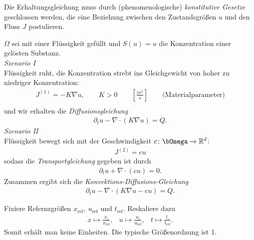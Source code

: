 Die Erhaltungsgleichung muss durch (phenomenologische)
\emph{konstitutive Gesetze} geschlossen werden, die eine Beziehung zwischen den
Zustandsgrö\ss en $u$ und den Fluss $J$ postulieren.


\begin{Beispiel}
    $\Omega$ sei mit einer Flüssigkeit gefüllt und $S(u) = u$ die
    Konzentration einer gelösten Substanz. \\
    \emph{Szenario I} \\
    Flüssigkeit ruht, die Konzentration strebt ins Gleichgewicht von hoher zu
    niedriger Konzentration:
    \begin{eqnarray*}
        J^{(1)} = -K\nabla u, \qquad K > 0 \qquad \left[\frac{m^2}{s}\right]
        \qquad \text{(Materialparameter)}\\
    \end{eqnarray*}
    und wir erhalten die \emph{Diffusionsgleichung}
    \begin{eqnarray*}
        \partial_t u - \nabla \cdot (K \nabla u) = Q.
    \end{eqnarray*}
    \emph{Szenario II} \\
    Flüssigkeit bewegt sich mit der Geschwindigkeit $c\colon \Omega \to \R^d$:
    \begin{eqnarray*}
        J^{(2)} = cu
    \end{eqnarray*}
    sodass die \emph{Transportgleichung} gegeben ist durch
    \begin{eqnarray*}
        \partial_t u + \nabla \cdot (cu) = 0.
    \end{eqnarray*}
    Zusammen ergibt sich die \emph{Konvektions-Diffusions-Gleichung}
    \begin{eqnarray*}
        \partial_t u - \nabla \cdot (K \nabla u  - cu) = Q.
    \end{eqnarray*}
\end{Beispiel}


\begin{Entdimensionalisierung}
    Fixiere Refernzgrö\ss en $x_\text{ref}, \ u_\text{ref}$ und $t_\text{ref}$.
    Reskaliere dazu
    \begin{eqnarray*}
        x\mapsto \frac{x_i}{x_\text{ref}}, &
        u\mapsto \frac{u_i}{u_\text{ref}}, &
        t\mapsto \frac{t_i}{t_\text{ref}}.
    \end{eqnarray*}
    Somit erhält man keine Einheiten. Die typische Grö\ss enordnung ist 1.
\end{Entdimensionalisierung}



